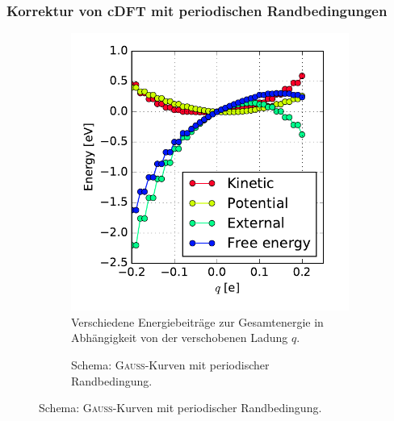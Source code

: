 \begin{frame}
\frametitle{Korrektur von cDFT mit periodischen Randbedingungen}
\begin{figure}
\centering
\begin{subfigure}{0.45\textwidth}
\centering
\includegraphics[width = \textwidth]{Images/Hydrogen/charging/energy_contributions_asymmetric}
\caption{Verschiedene Energiebeiträge zur Gesamtenergie in Abhängigkeit von der verschobenen Ladung $q$.}
\label{image_contributions_initial}
\end{subfigure}\hspace*{1cm}
\begin{subfigure}{0.45\textwidth}
\centering
{}
\caption{Schema: \textsc{Gauß}-Kurven mit periodischer Randbedingung.}
\end{subfigure}
\end{figure}
\end{frame}


